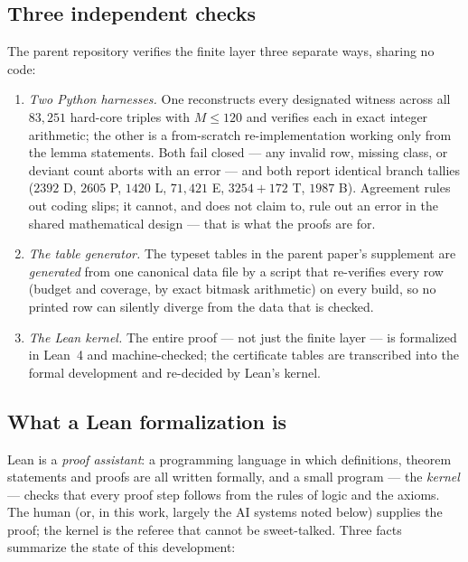 \documentclass[11pt,reqno]{amsart}
\theoremstyle{plain}
\theoremstyle{definition}
\theoremstyle{remark}
\begin{document}
\subsection{Three independent checks}

The parent repository verifies the finite layer three separate ways, sharing no
code:

\begin{enumerate}
\item \emph{Two Python harnesses.} One reconstructs every designated witness
      across all $83{,}251$ hard-core triples with $M \le 120$ and verifies each
      in exact integer arithmetic; the other is a from-scratch re-implementation
      working only from the lemma statements. Both fail closed --- any invalid
      row, missing class, or deviant count aborts with an error --- and both
      report identical branch tallies ($2392$ D, $2605$ P, $1420$ L, $71{,}421$
      E, $3254 + 172$ T, $1987$ B). Agreement rules out coding slips; it cannot,
      and does not claim to, rule out an error in the shared mathematical
      design --- that is what the proofs are for.
\item \emph{The table generator.} The typeset tables in the parent paper's
      supplement are \emph{generated} from one canonical data file by a script
      that re-verifies every row (budget and coverage, by exact bitmask
      arithmetic) on every build, so no printed row can silently diverge from
      the data that is checked.
\item \emph{The Lean kernel.} The entire proof --- not just the finite layer ---
      is formalized in Lean~4 and machine-checked; the certificate tables are
      transcribed into the formal development and re-decided by Lean's kernel.
\end{enumerate}

\subsection{What a Lean formalization is}

Lean is a \emph{proof assistant}: a programming language in which definitions,
theorem statements and proofs are all written formally, and a small program ---
the \emph{kernel} --- checks that every proof step follows from the rules of
logic and the axioms. The human (or, in this work, largely the AI systems noted
below) supplies the proof; the kernel is the referee that cannot be sweet-talked.
Three facts summarize the state of this development:
\end{document}

